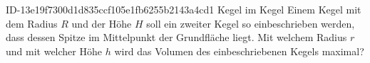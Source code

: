 \begin{exercise}
      {ID-13e19f7300d1d835ccf105e1fb6255b2143a4cd1}
      {Kegel im Kegel}
  \ifproblem\problem
    Einem Kegel mit dem Radius $R$ und der Höhe $H$ soll ein zweiter Kegel so
    einbeschrieben werden, dass dessen Spitze im Mittelpunkt der Grundfläche
    liegt. Mit welchem Radius $r$ und mit welcher Höhe $h$ wird das Volumen des
    einbeschriebenen Kegels maximal?
  \fi
\end{exercise}
